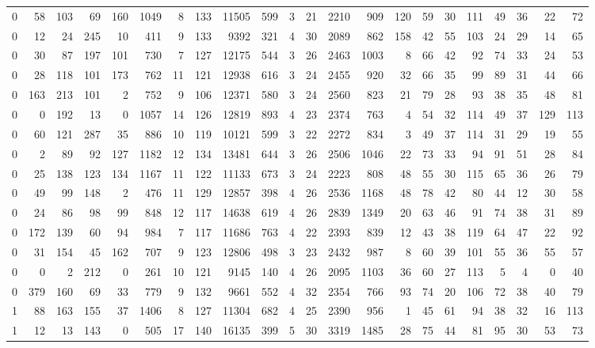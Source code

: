 {\begin{landscape}
\begin{longtable}[c]{lrrrrrrrrrrrrrrrrrrrrr}
0 & 58 & 103 & 69 & 160 & 1049 & 8 & 133 & 11505 & 599 & 3 & 21 & 2210 & 909 & 120 & 59 & 30 & 111 & 49 & 36 & 22 & 72 \\
0 & 12 & 24 & 245 & 10 & 411 & 9 & 133 & 9392 & 321 & 4 & 30 & 2089 & 862 & 158 & 42 & 55 & 103 & 24 & 29 & 14 & 65 \\
0 & 30 & 87 & 197 & 101 & 730 & 7 & 127 & 12175 & 544 & 3 & 26 & 2463 & 1003 & 8 & 66 & 42 & 92 & 74 & 33 & 24 & 53 \\
0 & 28 & 118 & 101 & 173 & 762 & 11 & 121 & 12938 & 616 & 3 & 24 & 2455 & 920 & 32 & 66 & 35 & 99 & 89 & 31 & 44 & 66 \\
0 & 163 & 213 & 101 & 2 & 752 & 9 & 106 & 12371 & 580 & 3 & 24 & 2560 & 823 & 21 & 79 & 28 & 93 & 38 & 35 & 48 & 81 \\
0 & 0 & 192 & 13 & 0 & 1057 & 14 & 126 & 12819 & 893 & 4 & 23 & 2374 & 763 & 4 & 54 & 32 & 114 & 49 & 37 & 129 & 113 \\
0 & 60 & 121 & 287 & 35 & 886 & 10 & 119 & 10121 & 599 & 3 & 22 & 2272 & 834 & 3 & 49 & 37 & 114 & 31 & 29 & 19 & 55 \\
0 & 2 & 89 & 92 & 127 & 1182 & 12 & 134 & 13481 & 644 & 3 & 26 & 2506 & 1046 & 22 & 73 & 33 & 94 & 91 & 51 & 28 & 84 \\
0 & 25 & 138 & 123 & 134 & 1167 & 11 & 122 & 11133 & 673 & 3 & 24 & 2223 & 808 & 48 & 55 & 30 & 115 & 65 & 36 & 26 & 79 \\
0 & 49 & 99 & 148 & 2 & 476 & 11 & 129 & 12857 & 398 & 4 & 26 & 2536 & 1168 & 48 & 78 & 42 & 80 & 44 & 12 & 30 & 58 \\
0 & 24 & 86 & 98 & 99 & 848 & 12 & 117 & 14638 & 619 & 4 & 26 & 2839 & 1349 & 20 & 63 & 46 & 91 & 74 & 38 & 31 & 89 \\
0 & 172 & 139 & 60 & 94 & 984 & 7 & 117 & 11686 & 763 & 4 & 22 & 2393 & 839 & 12 & 43 & 38 & 119 & 64 & 47 & 22 & 92 \\
0 & 31 & 154 & 45 & 162 & 707 & 9 & 123 & 12806 & 498 & 3 & 23 & 2432 & 987 & 8 & 60 & 39 & 101 & 55 & 36 & 55 & 57 \\
0 & 0 & 2 & 212 & 0 & 261 & 10 & 121 & 9145 & 140 & 4 & 26 & 2095 & 1103 & 36 & 60 & 27 & 113 & 5 & 4 & 0 & 40 \\
0 & 379 & 160 & 69 & 33 & 779 & 9 & 132 & 9661 & 552 & 4 & 32 & 2354 & 766 & 93 & 74 & 20 & 106 & 72 & 38 & 40 & 79 \\
1 & 88 & 163 & 155 & 37 & 1406 & 8 & 127 & 11304 & 682 & 4 & 25 & 2390 & 956 & 1 & 45 & 61 & 94 & 38 & 32 & 16 & 113 \\
1 & 12 & 13 & 143 & 0 & 505 & 17 & 140 & 16135 & 399 & 5 & 30 & 3319 & 1485 & 28 & 75 & 44 & 81 & 95 & 30 & 53 & 73 \\

\end{longtable}
\end{landscape}}
